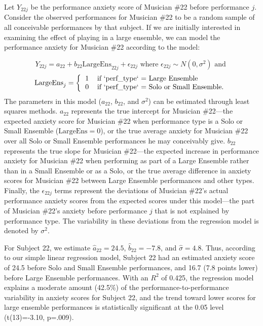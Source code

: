 \documentclass[
]{krantz}
\begin{document}
Let \(Y_{22j}\) be the performance anxiety score of Musician \#22 before performance \(j\). Consider the observed performances for Musician \#22 to be a random sample of all conceivable performances by that subject. If we are initially interested in examining the effect of playing in a large ensemble, we can model the performance anxiety for Musician \#22 according to the model:

\begin{equation}
Y_{22j}=a_{22}+b_{22}\textrm{LargeEns}_{22j}+\epsilon_{22j} \textrm{ where } \epsilon_{22j}\sim N(0,\sigma^2) \textrm{ and }
\label{eq:level1a}
\end{equation}
\[ \textrm{LargeEns}_{j} =
\left\lbrace
\begin{tabular}{l l} 
1 & if `perf\_type` = Large Ensemble \\
0 & if `perf\_type` = Solo or Small Ensemble. 
\end{tabular}\right.
\]
The parameters in this model (\(a_{22}\), \(b_{22}\), and \(\sigma^2\)) can be estimated through least squares methods. \(a_{22}\) represents the true intercept for Musician \#22---the expected anxiety score for Musician \#22 when performance type is a Solo or Small Ensemble (\(\textrm{LargeEns}=0\)), or the true average anxiety for Musician \#22 over all Solo or Small Ensemble performances he may conceivably give. \(b_{22}\) represents the true slope for Musician \#22---the expected increase in performance anxiety for Musician \#22 when performing as part of a Large Ensemble rather than in a Small Ensemble or as a Solo, or the true average difference in anxiety scores for Musician \#22 between Large Ensemble performances and other types. Finally, the \(\epsilon_{22j}\) terms represent the deviations of Musician \#22's actual performance anxiety scores from the expected scores under this model---the part of Musician \#22's anxiety before performance \(j\) that is not explained by performance type. The variability in these deviations from the regression model is denoted by \(\sigma^2\).

For Subject 22, we estimate \(\hat{a}_{22}=24.5\), \(\hat{b}_{22}=-7.8\), and \(\hat{\sigma}=4.8\). Thus, according to our simple linear regression model, Subject 22 had an estimated anxiety score of 24.5 before Solo and Small Ensemble performances, and 16.7 (7.8 points lower) before Large Ensemble performances. With an \(R^2\) of 0.425, the regression model explains a moderate amount (42.5\%) of the performance-to-performance variability in anxiety scores for Subject 22, and the trend toward lower scores for large ensemble performances is statistically significant at the 0.05 level (t(13)=-3.10, p=.009).
\end{document}
